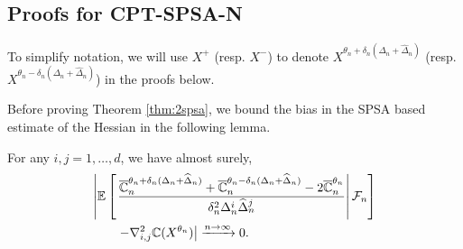 \subsection{Proofs for CPT-SPSA-N}
\label{sec:proofs-spsa-n}
To simplify notation, we will use $X^{+}$ (resp. $X^{-}$) to denote $X^{\theta_n+\delta_n(\Delta_n+\widehat\Delta_n)}$ (resp. $X^{\theta_n-\delta_n(\Delta_n+\widehat\Delta_n)}$) in the proofs below.

Before proving Theorem \ref{thm:2spsa}, we bound the bias in the SPSA based estimate of the Hessian in the following lemma.
\begin{lemma}
\label{lemma:2spsa-bias}
For any $i, j= 1,\ldots,d$, we have almost surely,  
\begin{align*}
&    \left| \mathbb{E}\left[\left.\dfrac{\overline {\mathbb{C}}_n^{\theta_n+\delta_n(\Delta_n+\widehat\Delta_n)} + \overline {\mathbb{C}}_n^{\theta_n-\delta_n(\Delta_n+\widehat\Delta_n)} - 2 \overline {\mathbb{C}}_n^{\theta_n}}{\delta_n^2 \Delta_n^{i}\widehat\Delta_n^j}\right| \mathcal{F}_n \right] \right.\\
		&\left.\qquad- \nabla^2_{i,j} \mathbb{C}(X^{\theta_n}) \right| \xrightarrow{n \rightarrow\infty} 0.
\end{align*} 
\end{lemma}
